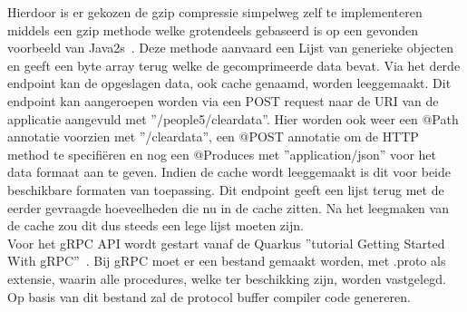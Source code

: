 Hierdoor is er gekozen de gzip compressie simpelweg zelf te implementeren middels een gzip methode welke grotendeels gebaseerd is op een gevonden voorbeeld van Java2s~\parencite{gzipCompressie}.
Deze methode aanvaard een Lijst van generieke objecten en geeft een byte array terug welke de gecomprimeerde data bevat.\newline
Via het derde endpoint kan de opgeslagen data, ook cache genaamd, worden leeggemaakt. Dit endpoint kan aangeroepen worden via een POST request naar
de URI van de applicatie aangevuld met ''/people5/cleardata''. Hier worden ook weer een @Path annotatie voorzien met ''/cleardata'', een @POST annotatie om de HTTP method te
specifi\"eren en nog een @Produces met ''application/json'' voor het data formaat aan te geven. Indien de cache wordt leeggemaakt is dit voor beide beschikbare formaten van toepassing.
Dit endpoint geeft een lijst terug met de eerder gevraagde hoeveelheden die nu in de cache zitten.
Na het leegmaken van de cache zou dit dus steeds een lege lijst moeten zijn.\newline
~\autocite{quarkusREST,Jakarta}
~\\

Voor het gRPC API wordt gestart vanaf de Quarkus ''tutorial Getting Started With gRPC''~\parencite{quarkusgRPC}.
Bij gRPC moet er een bestand gemaakt worden, met .proto als extensie, waarin alle procedures, welke ter beschikking zijn, worden vastgelegd.
Op basis van dit bestand zal de protocol buffer compiler code genereren.

